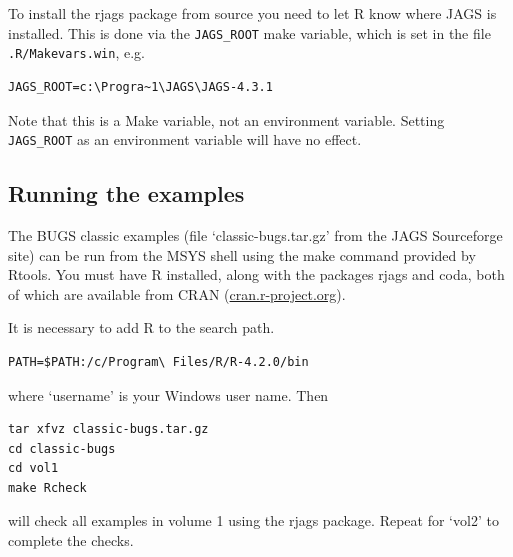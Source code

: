 \documentclass[11pt, a4paper, titlepage]{article}
\newcommand{\JAGS}{\textsf{JAGS}}
\newcommand{\code}[1]{{\bgroup{\normalfont\ttfamily #1}\egroup}}
\newcommand{\file}[1]{{`\normalfont\textsf{#1}'}}
\let\command=\code
\begin{document}
To install the \textsf{rjags} package from source you need to let R know 
where JAGS is installed. This is done via the \texttt{JAGS\_ROOT} make variable,
which is set in the file \texttt{.R/Makevars.win}, e.g.
\begin{verbatim}
JAGS_ROOT=c:\Progra~1\JAGS\JAGS-4.3.1
\end{verbatim}

Note that this is a Make variable, not an environment
variable. Setting \texttt{JAGS\_ROOT} as an environment variable will
have no effect.

\subsection{Running the examples}

The BUGS classic examples (file \file{classic-bugs.tar.gz} from the
JAGS Sourceforge site) can be run from the MSYS shell
using the \command{make} command provided by Rtools. You must have R
installed, along with the packages \code{rjags} and \code{coda}, both
of which are available from CRAN (\url{cran.r-project.org}).

It is necessary to add R to the search path.
\begin{verbatim}
PATH=$PATH:/c/Program\ Files/R/R-4.2.0/bin
\end{verbatim}
where \file{username} is your Windows user name. Then
\begin{verbatim}
tar xfvz classic-bugs.tar.gz
cd classic-bugs
cd vol1
make Rcheck
\end{verbatim}
will check all examples in volume 1 using the \code{rjags} package. Repeat
for \file{vol2} to complete the checks.
\end{document}
